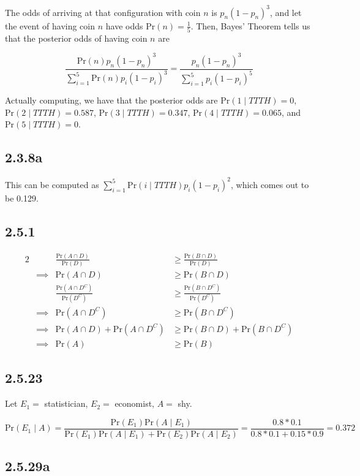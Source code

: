 \documentclass[12pt,letterpaper]{article}
\theoremstyle{definition}
\newcommand{\pr}[1]{\text{Pr}\left(#1\right)}
\begin{document}
The odds of arriving at that configuration with coin $n$ is $p_n(1-p_n)^3$, and
let the event of having coin $n$ have odds $\pr{n} = \frac{1}{5}$.
Then, Bayes' Theorem tells us that the posterior odds of having coin $n$ are

\[
  \frac{\pr{n}p_n(1-p_n)^3}{\sum_{i=1}^5\pr{n}p_i(1-p_i)^3} =
  \frac{p_n(1-p_n)^3}{\sum_{i=1}^5p_i(1 - p_i)^5}
\]

Actually computing, we have that the posterior odds are $\pr{1 \mid TTTH} = 0$,
$\pr{2 \mid TTTH} = 0.587$, $\pr{3 \mid TTTH} = 0.347$, $\pr{4 \mid TTTH} =
0.065$, and $\pr{5 \mid TTTH} = 0$.

\subsection*{2.3.8a}

This can be computed as $\sum_{i=1}^5\pr{i \mid TTTH}p_i(1-p_i)^2$, which comes
out to be 0.129.

\subsection*{2.5.1}

\begin{alignat*}{2}
  &&\frac{\pr{A \cap D}}{\pr{D}} &\geq \frac{\pr{B \cap D}}{\pr{D}} \\
  &\implies& \pr{A \cap D} &\geq \pr{B \cap D} \\
  &&\frac{\pr{A \cap D^C}}{\pr{D^C}} &\geq \frac{\pr{B \cap D^C}}{\pr{D^C}} \\
  &\implies& \pr{A \cap D^C} &\geq \pr{B \cap D^C} \\
  &\implies& \pr{A \cap D} + \pr{A \cap D^C} &\geq \pr{B \cap D} + \pr{B \cap
    D^C} \\
  &\implies& \pr{A} &\geq \pr{B}
\end{alignat*}

\subsection*{2.5.23}

Let $E_1 = $ statistician, $E_2 = $ economist, $A = $ shy.

\[
  \pr{E_1 \mid A} = \frac{\pr{E_1}\pr{A \mid E_1}}{\pr{E_1}\pr{A \mid E_1} +
    \pr{E_2}\pr{A \mid E_2}} = \frac{0.8 * 0.1}{0.8 * 0.1 + 0.15 * 0.9} = 0.372
\]

\subsection*{2.5.29a}
\end{document}
